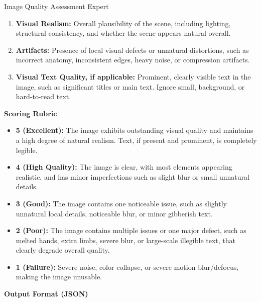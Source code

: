\documentclass{llmxive}
\begin{document}
\begin{promptbox}[label={System Prompts: Visual Quality}]{Image Quality Assessment Expert}
\begin{enumerate}[label=\arabic*., leftmargin=2.2em, labelsep=0.5em, itemsep=2pt]
    \item \textbf{Visual Realism:} Overall plausibility of the scene, including lighting, structural consistency, and whether the scene appears natural overall.
    
    \item \textbf{Artifacts:} Presence of local visual defects or unnatural distortions, such as incorrect anatomy, inconsistent edges, heavy noise, or compression artifacts.
    
    \item \textbf{Visual Text Quality, if applicable:} Prominent, clearly visible text in the image, such as significant titles or main text. Ignore small, background, or hard-to-read text.
\end{enumerate}

\medskip

\textbf{Scoring Rubric}

\begin{itemize}[leftmargin=2.2em, labelsep=0.5em, itemsep=2pt]
    \item \textbf{5 (Excellent):} The image exhibits outstanding visual quality and maintains a high degree of natural realism. Text, if present and prominent, is completely legible.
    
    \item \textbf{4 (High Quality):} The image is clear, with most elements appearing realistic, and has minor imperfections such as slight blur or small unnatural details.
    
    \item \textbf{3 (Good):} The image contains one noticeable issue, such as slightly unnatural local details, noticeable blur, or minor gibberish text.
    
    \item \textbf{2 (Poor):} The image contains multiple issues or one major defect, such as melted hands, extra limbs, severe blur, or large-scale illegible text, that clearly degrade overall quality.
    
    \item \textbf{1 (Failure):} Severe noise, color collapse, or severe motion blur/defocus, making the image unusable.
\end{itemize}

\medskip

\textbf{Output Format (JSON)}


\end{promptbox}
\end{document}
